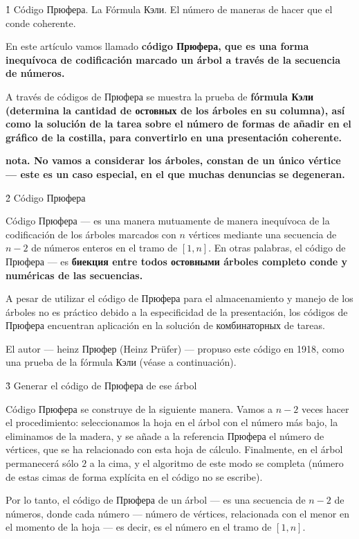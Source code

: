 \h1{ Código Прюфера. La Fórmula Кэли. El número de maneras de hacer que el conde coherente.}

En este artículo vamos llamado \bf{código Прюфера}, que es una forma inequívoca de codificación marcado un árbol a través de la secuencia de números.

A través de códigos de Прюфера se muestra la prueba de \bf{fórmula Кэли} (determina la cantidad de остовных de los árboles en su columna), así como la solución de la tarea sobre el número de formas de añadir en el gráfico de la costilla, para convertirlo en una presentación coherente.

\bf{nota}. No vamos a considerar los árboles, constan de un único vértice --- este es un caso especial, en el que muchas denuncias se degeneran.



\h2{ Código Прюфера }

Código Прюфера --- es una manera mutuamente de manera inequívoca de la codificación de los árboles marcados con $n$ vértices mediante una secuencia de $n-2$ de números enteros en el tramo de $[1, n]$. En otras palabras, el código de Прюфера --- es \bf{биекция} entre todos остовными árboles completo conde y numéricas de las secuencias.

A pesar de utilizar el código de Прюфера para el almacenamiento y manejo de los árboles no es práctico debido a la especificidad de la presentación, los códigos de Прюфера encuentran aplicación en la solución de комбинаторных de tareas.

El autor --- heinz Прюфер (Heinz Prüfer) --- propuso este código en 1918, como una prueba de la fórmula Кэли (véase a continuación).


\h3{ Generar el código de Прюфера de ese árbol }

Código Прюфера se construye de la siguiente manera. Vamos a $n-2$ veces hacer el procedimiento: seleccionamos la hoja en el árbol con el número más bajo, la eliminamos de la madera, y se añade a la referencia Прюфера el número de vértices, que se ha relacionado con esta hoja de cálculo. Finalmente, en el árbol permanecerá sólo $2$ a la cima, y el algoritmo de este modo se completa (número de estas cimas de forma explícita en el código no se escribe).

Por lo tanto, el código de Прюфера de un árbol --- es una secuencia de $n-2$ de números, donde cada número --- número de vértices, relacionada con el menor en el momento de la hoja --- es decir, es el número en el tramo de $[1, n]$.

